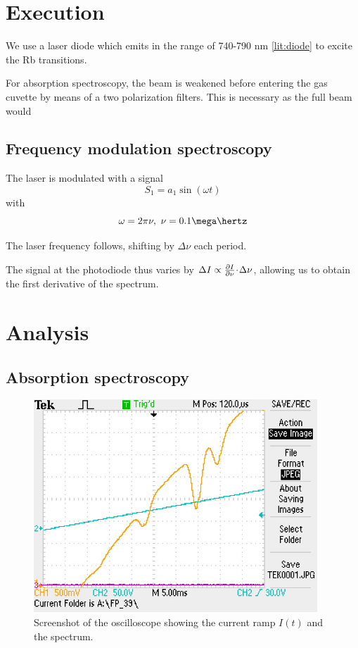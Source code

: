 
\section{Execution} %

We use a laser diode which emits in the range of 740-790 nm \ref{lit:diode} to excite the \textsf{Rb} transitions.

For absorption spectroscopy, the beam is weakened before entering the gas cuvette by means of a two polarization filters. This is necessary as the full beam would 

\subsection{Frequency modulation spectroscopy}
The laser is modulated with a signal
\begin{equation}
 S_1 = a_1 \sin(\omega t)
\end{equation}
with
\begin{equation}
 \omega = 2 \pi \nu,~ \nu = 0.1 \mega\hertz
\end{equation}

The laser frequency follows, shifting by $\Delta \nu$ each period.

The signal at the photodiode thus varies by $\Delta I \propto \frac{\partial I}{\partial\nu} \!\cdot\! \Delta \nu$, allowing us to obtain the first derivative of the spectrum. 


\newpage
\section{Analysis}
\subsection{Absorption spectroscopy}

\begin{figure}[p]
	\centering
	\includegraphics[width=0.95\textwidth]{data/TEK0001.jpg}
	\caption{Screenshot of the oscilloscope showing the current ramp $I(t)$ and the spectrum.}
	\label{fig:oszi}
\end{figure}


